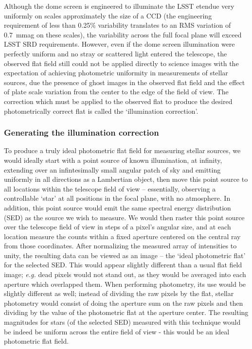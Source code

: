 \documentclass[12pt,preprint]{aastex}
\begin{document}
Although the dome screen is engineered to illuminate the LSST etendue
very uniformly on scales approximately the size of a CCD (the
engineering requirement of less than 0.25\% variability translates to
an RMS variation of 0.7~mmag on these scales), the variability across
the full focal plane will exceed LSST SRD requirements. However, even
if the dome screen illumination were perfectly uniform and no stray or
scattered light entered the telescope, the observed flat field still
could not be applied directly to science images with the expectation
of achieving photometric uniformity in measurements of stellar
sources, due the presence of ghost images in the observed flat field
and the effect of plate scale variation from the center to the edge of
the field of view.  The correction which must be applied to the
observed flat to produce the desired photometrically correct flat is
called the `illumination correction'.


\subsubsection{Generating the illumination correction}
\label{sec:ic}

To produce a truly ideal photometric flat field for measuring stellar
sources, we would ideally start with a point source of known
illumination, at infinity, extending over an infintesimally small
angular patch of sky and emitting uniformly in all directions as a
Lambertian object, then move this point source to all locations within
the telescope field of view -- essentially, observing a controllable
`star' at all positions in the focal plane, with no atmosphere. In
addition, this point source would emit the same spectral energy
distribution (SED) as the source we wish to measure. We would then
raster this point source over the telescope field of view in steps of
a pixel's angular size, and at each location measure the counts within
a fixed aperture centered on the central ray from those coordinates.
After normalizing the measured array of intensities to unity, the
resulting data can be viewed as an image -- the `ideal photometric
flat' for the selected SED.  This would appear slightly different than
a usual flat field image; {\it e.g.} dead pixels would not stand out,
as they would be averaged into each aperture which overlapped
them. When performing photometry, its use would be slightly different
as well; instead of dividing the raw pixels by the flat, stellar
photometry would consist of doing the aperture sum on the raw pixels
and then dividing by the value of the photometric flat at the aperture
center.  The resulting magnitudes for stars (of the selected SED)
measured with this technique would be indeed be uniform across the
entire field of view - this would be an ideal photometric flat field.
\end{document}
